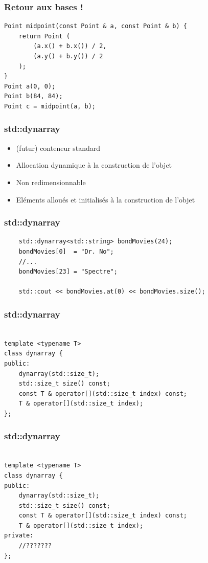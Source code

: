 \documentclass[xetex,mathserif]{beamer}
\begin{document}
\begin{frame}[containsverbatim]
\frametitle{Retour aux bases !}
\begin{lstlisting}
Point midpoint(const Point & a, const Point & b) {
	return Point (
		(a.x() + b.x()) / 2,
		(a.y() + b.y()) / 2
	);
}
Point a(0, 0);
Point b(84, 84);
Point c = midpoint(a, b);
\end{lstlisting}
\end{frame}

\begin{frame}
\frametitle{std::dynarray}

\begin{itemize}
	\item (futur) conteneur standard
	\pause
	\item Allocation dynamique à la construction de l'objet
	\pause
	\item Non redimensionnable
	\pause
	\item Eléments alloués et initialisés à la construction de l'objet
\end{itemize}  
\end{frame}

\begin{frame}[containsverbatim]
\frametitle{std::dynarray}
\begin{lstlisting}
	std::dynarray<std::string> bondMovies(24);
	bondMovies[0]  = "Dr. No";
	//...
	bondMovies[23] = "Spectre";
	
	std::cout << bondMovies.at(0) << bondMovies.size();  
\end{lstlisting}
\end{frame}


\begin{frame}[containsverbatim]
\frametitle{std::dynarray}
\begin{lstlisting}

template <typename T>
class dynarray {
public:
	dynarray(std::size_t);	
	std::size_t size() const;
	const T & operator[](std::size_t index) const;
	T & operator[](std::size_t index);
};
\end{lstlisting}
\end{frame}

\begin{frame}[containsverbatim]
\frametitle{std::dynarray}
\begin{lstlisting}

template <typename T>
class dynarray {
public:
	dynarray(std::size_t);	
	std::size_t size() const;
	const T & operator[](std::size_t index) const;
	T & operator[](std::size_t index);
private:
	//???????
};
\end{lstlisting}
\end{frame}
\end{document}
